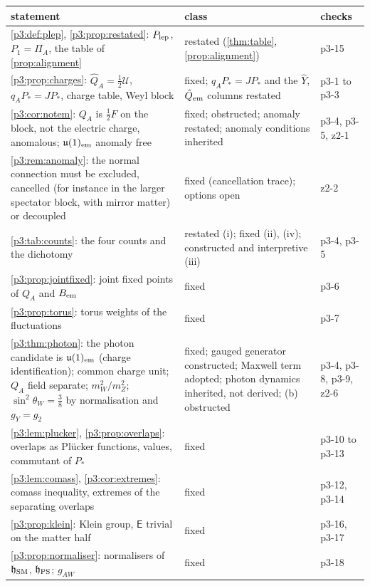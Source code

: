 \begin{table}[t]
\centering
\footnotesize
\begin{tabular}{@{}>{\raggedright\arraybackslash}p{8.4cm}>{\raggedright\arraybackslash}p{4.3cm}>{\raggedright\arraybackslash}p{2.2cm}@{}}
\toprule
statement & class & checks\\
\midrule
\cref{p3:def:plep}, \cref{p3:prop:restated}: $P_{\rm lep}$, $P_1=\Pi_A$, the table of \cref{prop:alignment} & restated (\cref{thm:table}, \cref{prop:alignment}) & p3-15\\
\cref{p3:prop:charges}: $\hat Q_A=\tfrac12\mathcal U$, $q_AP_*=JP_*$, charge table, Weyl block & fixed; $q_AP_*=JP_*$ and the $\hat Y$, $\hat Q_{\rm em}$ columns restated & p3-1 to p3-3\\
\cref{p3:cor:notem}: $Q_A$ is $\tfrac12F$ on the block, not the electric charge, anomalous; $\mathfrak{u}(1)_{\rm em}$ anomaly free & fixed; obstructed; anomaly restated; anomaly conditions inherited & p3-4, p3-5, z2-1\\
\cref{p3:rem:anomaly}: the normal connection must be excluded, cancelled (for instance in the larger spectator block, with mirror matter) or decoupled & fixed (cancellation trace); options open & z2-2\\
\cref{p3:tab:counts}: the four counts and the dichotomy & restated (i); fixed (ii), (iv); constructed and interpretive (iii) & p3-4, p3-5\\
\cref{p3:prop:jointfixed}: joint fixed points of $Q_A$ and $B_{\rm em}$ & fixed & p3-6\\
\cref{p3:prop:torus}: torus weights of the fluctuations & fixed & p3-7\\
\cref{p3:thm:photon}: the photon candidate is $\mathfrak{u}(1)_{\rm em}$ (charge identification); common charge unit; $Q_A$ field separate; $m_W^2/m_Z^2$; $\sin^2\theta_W=\tfrac38$ by normalisation and $g_Y=g_2$ & fixed; gauged generator constructed; Maxwell term adopted; photon dynamics inherited, not derived; (b) obstructed & p3-4, p3-8, p3-9, z2-6\\
\cref{p3:lem:plucker}, \cref{p3:prop:overlaps}: overlaps as Plücker functions, values, commutant of $P_*$ & fixed & p3-10 to p3-13\\
\cref{p3:lem:comass}, \cref{p3:cor:extremes}: comass inequality, extremes of the separating overlaps & fixed & p3-12, p3-14\\
\cref{p3:prop:klein}: Klein group, $\mathsf E$ trivial on the matter half & fixed & p3-16, p3-17\\
\cref{p3:prop:normaliser}: normalisers of $\mathfrak h_{\rm SM}$, $\mathfrak h_{\rm PS}$; $g_{AW}$ & fixed & p3-18\\

\end{tabular}
\end{table}
